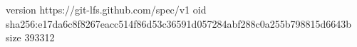 version https://git-lfs.github.com/spec/v1
oid sha256:e17da6c8f8267eacc514f86d53c36591d057284abf288c0a255b798815d6643b
size 393312
